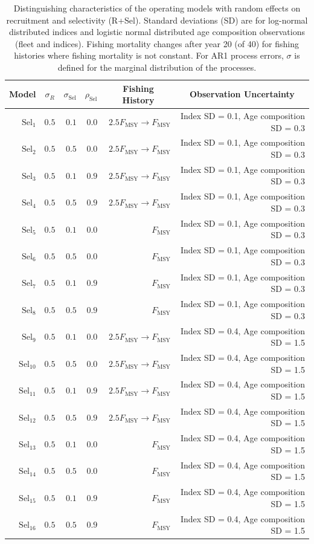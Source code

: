 \documentclass[
  12pt,
]{article}
\begin{document}
\begin{landscape}
\begin{table}
\caption{Distinguishing characteristics of the operating models with random effects on recruitment and selectivity (R+Sel). Standard deviations (SD) are for log-normal distributed indices and logistic normal distributed age composition observations (fleet and indices). Fishing mortality changes after year 20 (of 40) for fishing histories where fishing mortality is not constant. For AR1 process errors, $\sigma$ is defined for the marginal distribution of the processes.}\label{sel_om_table}
{\begin{center}
\begin{tabular}{rrrrrr}
\hline\hline
\multicolumn{1}{c}{Model}&\multicolumn{1}{c}{$\sigma_R$}&\multicolumn{1}{c}{$\sigma_{\text{Sel}}$}&\multicolumn{1}{c}{$\rho_{\text{Sel}}$}&\multicolumn{1}{c}{Fishing History}&\multicolumn{1}{c}{Observation Uncertainty}\tabularnewline
\hline
$\text{Sel}_{1}$&$0.5$&$0.1$&$0.0$&$2.5 F_{\text{MSY}} \rightarrow F_{\text{MSY}}$&Index SD = 0.1, Age composition SD = 0.3\tabularnewline
$\text{Sel}_{2}$&$0.5$&$0.5$&$0.0$&$2.5 F_{\text{MSY}} \rightarrow F_{\text{MSY}}$&Index SD = 0.1, Age composition SD = 0.3\tabularnewline
$\text{Sel}_{3}$&$0.5$&$0.1$&$0.9$&$2.5 F_{\text{MSY}} \rightarrow F_{\text{MSY}}$&Index SD = 0.1, Age composition SD = 0.3\tabularnewline
$\text{Sel}_{4}$&$0.5$&$0.5$&$0.9$&$2.5 F_{\text{MSY}} \rightarrow F_{\text{MSY}}$&Index SD = 0.1, Age composition SD = 0.3\tabularnewline
$\text{Sel}_{5}$&$0.5$&$0.1$&$0.0$&$F_{\text{MSY}}$&Index SD = 0.1, Age composition SD = 0.3\tabularnewline
$\text{Sel}_{6}$&$0.5$&$0.5$&$0.0$&$F_{\text{MSY}}$&Index SD = 0.1, Age composition SD = 0.3\tabularnewline
$\text{Sel}_{7}$&$0.5$&$0.1$&$0.9$&$F_{\text{MSY}}$&Index SD = 0.1, Age composition SD = 0.3\tabularnewline
$\text{Sel}_{8}$&$0.5$&$0.5$&$0.9$&$F_{\text{MSY}}$&Index SD = 0.1, Age composition SD = 0.3\tabularnewline
$\text{Sel}_{9}$&$0.5$&$0.1$&$0.0$&$2.5 F_{\text{MSY}} \rightarrow F_{\text{MSY}}$&Index SD = 0.4, Age composition SD = 1.5\tabularnewline
$\text{Sel}_{10}$&$0.5$&$0.5$&$0.0$&$2.5 F_{\text{MSY}} \rightarrow F_{\text{MSY}}$&Index SD = 0.4, Age composition SD = 1.5\tabularnewline
$\text{Sel}_{11}$&$0.5$&$0.1$&$0.9$&$2.5 F_{\text{MSY}} \rightarrow F_{\text{MSY}}$&Index SD = 0.4, Age composition SD = 1.5\tabularnewline
$\text{Sel}_{12}$&$0.5$&$0.5$&$0.9$&$2.5 F_{\text{MSY}} \rightarrow F_{\text{MSY}}$&Index SD = 0.4, Age composition SD = 1.5\tabularnewline
$\text{Sel}_{13}$&$0.5$&$0.1$&$0.0$&$F_{\text{MSY}}$&Index SD = 0.4, Age composition SD = 1.5\tabularnewline
$\text{Sel}_{14}$&$0.5$&$0.5$&$0.0$&$F_{\text{MSY}}$&Index SD = 0.4, Age composition SD = 1.5\tabularnewline
$\text{Sel}_{15}$&$0.5$&$0.1$&$0.9$&$F_{\text{MSY}}$&Index SD = 0.4, Age composition SD = 1.5\tabularnewline
$\text{Sel}_{16}$&$0.5$&$0.5$&$0.9$&$F_{\text{MSY}}$&Index SD = 0.4, Age composition SD = 1.5\tabularnewline
\hline
\end{tabular}\end{center}
}
\end{table}
\end{landscape}
\end{document}
